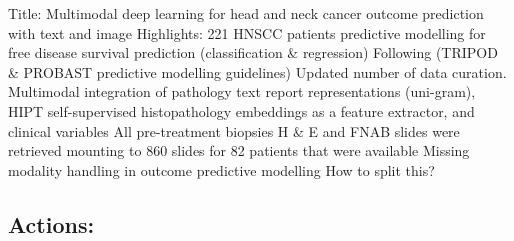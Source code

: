 \documentclass{article}%
\begin{document}
%
\normalsize%
Title: Multimodal deep learning for head and neck cancer outcome prediction with text and image%
\newline%
\newline%
%
Highlights: %
\newline%
\newline%
%
221 HNSCC patients predictive modelling for free disease survival prediction (classification \& regression)%
\newline%
\newline%
%
Following (TRIPOD \& PROBAST predictive modelling guidelines) %
\newline%
\newline%
%
Updated number of data curation. %
\newline%
\newline%
%
Multimodal integration of pathology text report representations (uni{-}gram), HIPT self{-}supervised histopathology embeddings as a feature extractor, and clinical variables %
\newline%
\newline%
%
All pre{-}treatment biopsies H \& E and FNAB slides were retrieved mounting to 860 slides for 82 patients that were available %
\newline%
\newline%
%
Missing modality handling in outcome predictive modelling %
\newline%
\newline%
%
How to split this? %
\newline%
\newline%
%
%
\newline%
\newline%
%
%
\newline%
\newline%
%
\subsection{Actions: }%
\label{subsec:Actions}%
\end{document}
